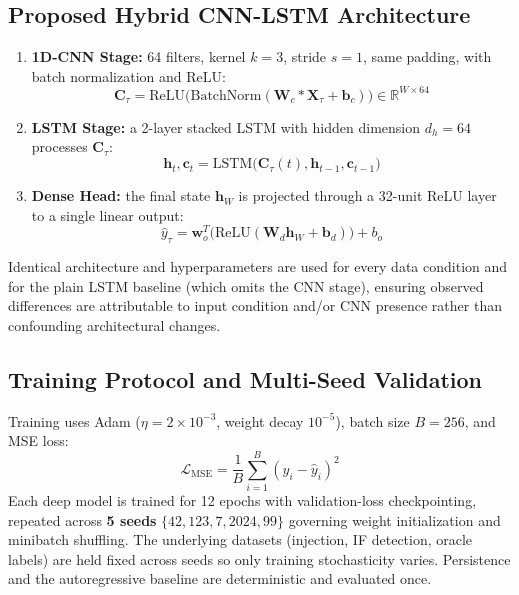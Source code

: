 \documentclass[conference]{IEEEtran}
\begin{document}
\subsection{Proposed Hybrid CNN-LSTM Architecture}
\begin{enumerate}
    \item \textbf{1D-CNN Stage:} 64 filters, kernel $k=3$, stride $s=1$, same padding, with batch normalization and ReLU:
    \begin{equation}
    \mathbf{C}_\tau = \text{ReLU}\big(\text{BatchNorm}(\mathbf{W}_c * \mathbf{X}_\tau + \mathbf{b}_c)\big) \in \mathbb{R}^{W \times 64}
    \end{equation}
    \item \textbf{LSTM Stage:} a 2-layer stacked LSTM with hidden dimension $d_h=64$ processes $\mathbf{C}_\tau$:
    \begin{equation}
    \mathbf{h}_t, \mathbf{c}_t = \text{LSTM}\big(\mathbf{C}_\tau(t), \mathbf{h}_{t-1}, \mathbf{c}_{t-1}\big)
    \end{equation}
    \item \textbf{Dense Head:} the final state $\mathbf{h}_W$ is projected through a 32-unit ReLU layer to a single linear output:
    \begin{equation}
    \hat{y}_\tau = \mathbf{w}_o^T\big(\text{ReLU}(\mathbf{W}_d \mathbf{h}_W + \mathbf{b}_d)\big) + b_o
    \end{equation}
\end{enumerate}
Identical architecture and hyperparameters are used for every data condition and for the plain LSTM baseline (which omits the CNN stage), ensuring observed differences are attributable to input condition and/or CNN presence rather than confounding architectural changes.

\subsection{Training Protocol and Multi-Seed Validation}
Training uses Adam ($\eta = 2\times 10^{-3}$, weight decay $10^{-5}$), batch size $B=256$, and MSE loss:
\begin{equation}
\mathcal{L}_{\text{MSE}} = \frac{1}{B}\sum_{i=1}^{B}\left(y_i - \hat{y}_i\right)^2
\end{equation}
Each deep model is trained for 12 epochs with validation-loss checkpointing, repeated across \textbf{5 seeds} $\{42, 123, 7, 2024, 99\}$ governing weight initialization and minibatch shuffling. The underlying datasets (injection, IF detection, oracle labels) are held fixed across seeds so only training stochasticity varies. Persistence and the autoregressive baseline are deterministic and evaluated once.
\end{document}
